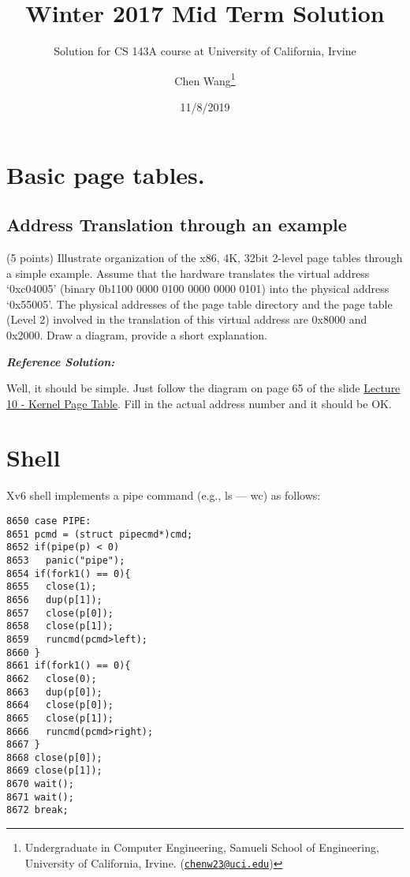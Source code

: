 \documentclass[]{article}
\title{Winter 2017 Mid Term Solution}
\subtitle{Solution for CS 143A course at University of California, Irvine}
\author{Chen Wang\footnote{Undergraduate in Computer Engineering, Samueli School
  of Engineering, University of California, Irvine.
  (\href{mailto:chenw23@uci.edu}{\nolinkurl{chenw23@uci.edu}})}}
\date{11/8/2019}
\begin{document}
\maketitle

{
\setcounter{tocdepth}{3}
\tableofcontents
}
\hypertarget{basic-page-tables.}{%
\section{Basic page tables.}\label{basic-page-tables.}}

\hypertarget{address-translation-through-an-example}{%
\subsection{Address Translation through an
example}\label{address-translation-through-an-example}}

(5 points) Illustrate organization of the x86, 4K, 32bit 2-level page
tables through a simple example. Assume that the hardware translates the
virtual address `0xc04005' (binary 0b1100 0000 0100 0000 0000 0101) into
the physical address `0x55005'. The physical addresses of the page table
directory and the page table (Level 2) involved in the translation of
this virtual address are 0x8000 and 0x2000. Draw a diagram, provide a
short explanation.

\textbf{\emph{Reference Solution:}}

Well, it should be simple. Just follow the diagram on page 65 of the
slide
\href{https://www.ics.uci.edu/~aburtsev/143A/lectures/lecture10-kernel-page-table/lecture10-kernel-page-table.pdf}{Lecture
10 - Kernel Page Table}. Fill in the actual address number and it should
be OK.

\hypertarget{shell}{%
\section{Shell}\label{shell}}

Xv6 shell implements a pipe command (e.g., ls --- wc) as follows:

\begin{verbatim}
8650 case PIPE:
8651 pcmd = (struct pipecmd*)cmd;
8652 if(pipe(p) < 0)
8653   panic("pipe");
8654 if(fork1() == 0){
8655   close(1);
8656   dup(p[1]);
8657   close(p[0]);
8658   close(p[1]);
8659   runcmd(pcmd>left);
8660 }
8661 if(fork1() == 0){
8662   close(0);
8663   dup(p[0]);
8664   close(p[0]);
8665   close(p[1]);
8666   runcmd(pcmd>right);
8667 }
8668 close(p[0]);
8669 close(p[1]);
8670 wait();
8671 wait();
8672 break;
\end{verbatim}
\end{document}
